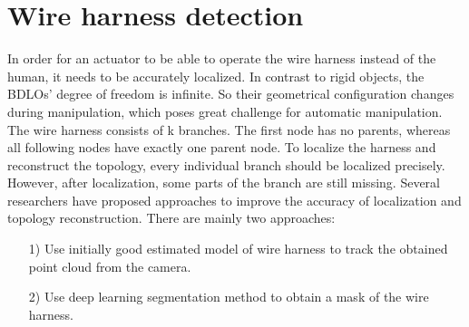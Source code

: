 \section{Wire harness detection} 
    In order for an actuator to be able to operate the wire harness instead of the human, it needs to be accurately localized. In contrast to rigid objects, the BDLOs' degree 
    of freedom is infinite. So their geometrical configuration changes during manipulation, which poses great challenge for automatic manipulation\cite{9665147}. 
    The wire harness consists of k branches. The first node has no parents, whereas all 
    following nodes have exactly one parent node\cite{10161483}. To localize the harness and reconstruct the topology, every individual branch should be localized precisely. 
    However, after localization, some parts of the branch are still missing. Several researchers have proposed approaches to improve the accuracy of localization and topology reconstruction. 
    There are mainly two approaches: 
    \begin{itemize}
        \item [1)] Use initially good estimated model of wire harness to track the obtained point cloud from the camera.
        \item [2)] Use deep learning segmentation method to obtain a mask of the wire harness.
    \end{itemize}
